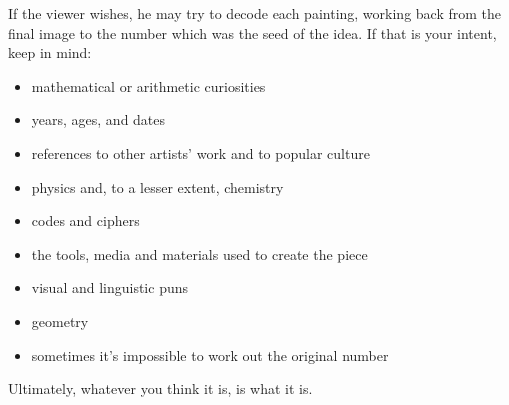 \documentclass[a4,10pt]{amsart}
\begin{document}
If the viewer wishes, he may try to decode each painting, working back from
the final image to the number which was the seed of the idea. If that is
your intent, keep in mind:

\begin{itemize}
\item mathematical or arithmetic curiosities
\item years, ages, and dates
\item references to other artists' work and to popular culture
\item physics and, to a lesser extent, chemistry
\item codes and ciphers
\item the tools, media and materials used to create the piece
\item visual and linguistic puns
\item geometry
\item sometimes it's impossible to work out the original number
\end{itemize}

Ultimately, whatever you think it is, is what it is.
\end{document}

